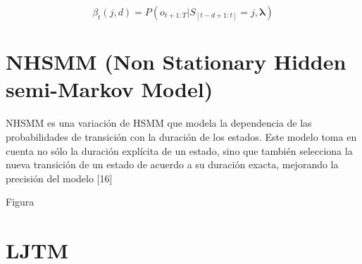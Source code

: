 \begin{equation}
\beta_{t}(j,d) = P(o_{t+1:T} \vert S_{[t-d+1:t]} = j, \boldsymbol\lambda)
\end{equation}


\section*{NHSMM (Non Stationary Hidden semi-Markov Model) }

NHSMM es una variaci\'on de HSMM que modela la dependencia de las probabilidades de transici\'on con la duraci\'on de los estados. Este modelo toma en cuenta no s\'olo la duraci\'on expl\'icita de un estado, sino que tambi\'en selecciona la nueva transici\'on de un estado de acuerdo a su duraci\'on exacta, mejorando la precisi\'on del modelo [16]

Figura




\section*{LJTM}





















